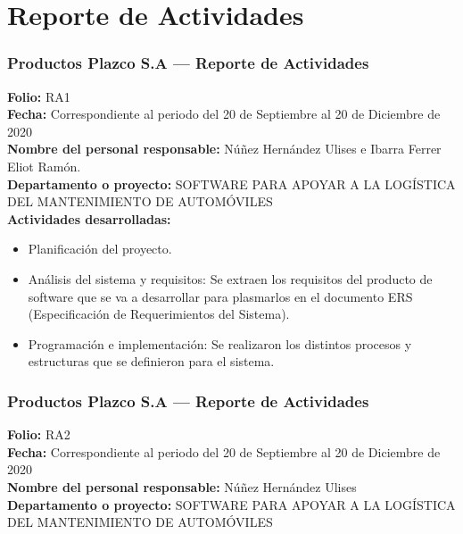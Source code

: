 \section{Reporte de Actividades}
\subsubsection{Productos Plazco S.A --- Reporte de Actividades \centering} 
\textbf{Folio:} RA1\\ 

\textbf{Fecha:} Correspondiente al periodo del 20 de Septiembre al 20 de Diciembre de 2020\\

\textbf{Nombre del personal responsable:} Núñez Hernández Ulises e Ibarra Ferrer Eliot Ramón.\\ 

\textbf{Departamento o proyecto:} SOFTWARE PARA APOYAR A LA LOGÍSTICA DEL MANTENIMIENTO DE AUTOMÓVILES\\ 

\textbf{Actividades desarrolladas:}
\begin{itemize}
	\item Planificación del proyecto.
	\item Análisis del sistema y requisitos:  Se extraen los requisitos del producto de software que se va a desarrollar para plasmarlos en el documento ERS (Especificación de Requerimientos del Sistema).
	\item Programación e implementación: Se realizaron los distintos procesos y estructuras que se definieron para el sistema.   
\end{itemize}

\subsubsection{Productos Plazco S.A --- Reporte de Actividades \centering}
\textbf{Folio:} RA2\\ 

\textbf{Fecha:} Correspondiente al periodo del 20 de Septiembre al 20 de Diciembre de 2020\\

\textbf{Nombre del personal responsable:} Núñez Hernández Ulises \\ 

\textbf{Departamento o proyecto:} SOFTWARE PARA APOYAR A LA LOGÍSTICA DEL MANTENIMIENTO DE AUTOMÓVILES\\ 


